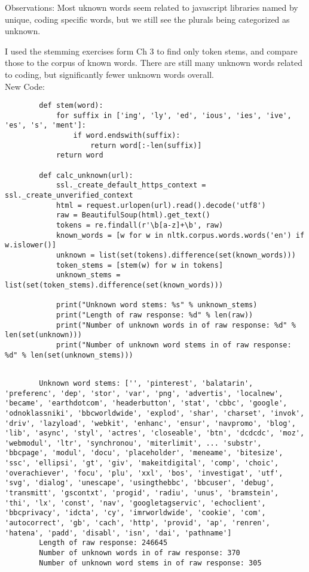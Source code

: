 \documentclass[12pt]{article}
\begin{document}
		Observations: Most uknown words seem related to javascript libraries named by unique, coding specific words, but we still see the plurals being categorized as unknown.
		
		I used the stemming exercises form Ch 3 to find only token stems, and compare those to the corpus of known words. There are still many unknown words related to coding, but significantly fewer unknown words overall.\\
		
		
		New Code:\\
		\begin{lstlisting}
		def stem(word):
			for suffix in ['ing', 'ly', 'ed', 'ious', 'ies', 'ive', 'es', 's', 'ment']:
				if word.endswith(suffix):
					return word[:-len(suffix)]
			return word
		
		def calc_unknown(url):
			ssl._create_default_https_context = ssl._create_unverified_context
			html = request.urlopen(url).read().decode('utf8')
			raw = BeautifulSoup(html).get_text()
			tokens = re.findall(r'\b[a-z]+\b', raw)
			known_words = [w for w in nltk.corpus.words.words('en') if w.islower()]
			unknown = list(set(tokens).difference(set(known_words)))
			token_stems = [stem(w) for w in tokens]
			unknown_stems = list(set(token_stems).difference(set(known_words)))
			
			print("Unknown word stems: %s" % unknown_stems)
			print("Length of raw response: %d" % len(raw))
			print("Number of unknown words in of raw response: %d" % len(set(unknown)))
			print("Number of unknown word stems in of raw response: %d" % len(set(unknown_stems)))
		
		\end{lstlisting}
		
		\begin{lstlisting}
		Unknown word stems: ['', 'pinterest', 'balatarin', 'preferenc', 'dep', 'stor', 'var', 'png', 'advertis', 'localnew', 'became', 'earthdotcom', 'headerbutton', 'stat', 'cbbc', 'google', 'odnoklassniki', 'bbcworldwide', 'explod', 'shar', 'charset', 'invok', 'driv', 'lazyload', 'webkit', 'enhanc', 'ensur', 'navpromo', 'blog', 'lib', 'async', 'styl', 'actres', 'closeable', 'btn', 'dcdcdc', 'moz', 'webmodul', 'ltr', 'synchronou', 'miterlimit', ... 'substr', 'bbcpage', 'modul', 'docu', 'placeholder', 'meneame', 'bitesize', 'ssc', 'ellipsi', 'gt', 'giv', 'makeitdigital', 'comp', 'choic', 'overachiever', 'focu', 'plu', 'xxl', 'bos', 'investigat', 'utf', 'svg', 'dialog', 'unescape', 'usingthebbc', 'bbcuser', 'debug', 'transmitt', 'gscontxt', 'progid', 'radiu', 'unus', 'bramstein', 'thi', 'lx', 'const', 'nav', 'googletagservic', 'echoclient', 'bbcprivacy', 'idcta', 'cy', 'imrworldwide', 'cookie', 'com', 'autocorrect', 'gb', 'cach', 'http', 'provid', 'ap', 'renren', 'hatena', 'padd', 'disabl', 'isn', 'dai', 'pathname']
		Length of raw response: 246645
		Number of unknown words in of raw response: 370
		Number of unknown word stems in of raw response: 305
		\end{lstlisting}
		
\end{document}
